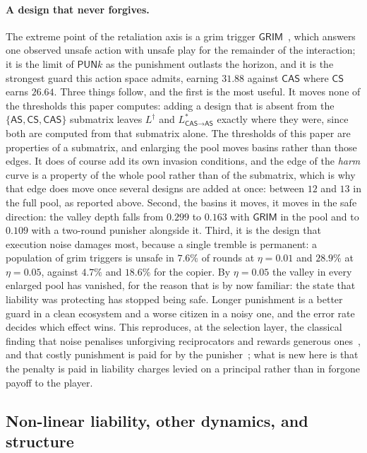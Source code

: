 \documentclass[pdflatex]{sn-jnl}
\theoremstyle{thmstyleone}
\theoremstyle{thmstylethree}
\theoremstyle{thmstyletwo}
\newcommand{\AS}{\textsf{AS}}
\newcommand{\CS}{\textsf{CS}}
\newcommand{\CAS}{\textsf{CAS}}
\begin{document}
\paragraph{A design that never forgives.}
The extreme point of the retaliation axis is a grim
trigger $\mathsf{GRIM}$~\citep{friedman1971supergames},
which answers one observed unsafe action with unsafe play for the remainder of
the interaction; it is the limit of $\mathsf{PUN}k$ as the punishment outlasts
the horizon, and it is the strongest guard this action space admits, earning
$31.88$ against $\CAS$ where $\CS$ earns $26.64$. Three things follow, and the
first is the most useful. It moves none of the thresholds this paper computes:
adding a design that is absent from the $\{\AS,\CS,\CAS\}$ submatrix leaves
$L^{\dagger}$ and $L^{*}_{\CAS\to\AS}$ exactly where they were, since both are
computed from that submatrix alone. The thresholds of this paper are
properties of a submatrix, and enlarging the pool moves basins rather than
those edges. It does of course add its own invasion conditions, and the edge
of the \emph{harm} curve is a property of the whole pool rather than of the
submatrix, which is why that edge does move once several designs are added at
once: between $12$ and $13$ in the full pool, as reported above. Second, the
basins it moves, it moves in the safe direction: the valley
depth falls from $0.299$ to $0.163$ with $\mathsf{GRIM}$ in the pool and to
$0.109$ with a two-round punisher alongside it. Third, it is the design that
execution noise damages most, because a single tremble is permanent: a
population of grim triggers is unsafe in $7.6\%$ of rounds at $\eta=0.01$ and
$28.9\%$ at $\eta=0.05$, against $4.7\%$ and $18.6\%$ for the copier. By
$\eta=0.05$ the valley in every enlarged pool has vanished, for the reason
that is by now familiar: the state that liability was protecting has stopped
being safe. Longer punishment is a better guard in a clean ecosystem and a
worse citizen in a noisy one, and the error rate decides which effect wins.
This reproduces, at the selection layer, the classical finding that noise
penalises unforgiving reciprocators and rewards generous
ones~\citep{molander1985optimal,nowak1992tit,fudenberg2012slow}, and that
costly punishment is paid for by the punisher~\citep{dreber2008winners}; what
is new here is that
the penalty is paid in liability charges levied on a principal rather than in
forgone payoff to the player.

\subsection{Non-linear liability, other dynamics, and structure}\label{sec:general}
\end{document}

